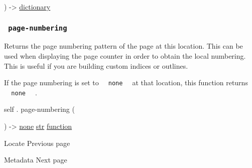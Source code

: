) -\textgreater{}
\href{/docs/reference/foundations/dictionary/}{dictionary}

\subsubsection{\texorpdfstring{\texttt{\ page-numbering\ }}{ page-numbering }}\label{definitions-page-numbering}

Returns the page numbering pattern of the page at this location. This
can be used when displaying the page counter in order to obtain the
local numbering. This is useful if you are building custom indices or
outlines.

If the page numbering is set to
\texttt{\ }{\texttt{\ none\ }}\texttt{\ } at that location, this
function returns \texttt{\ }{\texttt{\ none\ }}\texttt{\ } .

self { . } { page-numbering } (

) -\textgreater{} \href{/docs/reference/foundations/none/}{none}
\href{/docs/reference/foundations/str/}{str}
\href{/docs/reference/foundations/function/}{function}

\href{/docs/reference/introspection/locate/}{\pandocbounded{}}

{ Locate } { Previous page }

\href{/docs/reference/introspection/metadata/}{\pandocbounded{}}

{ Metadata } { Next page }
